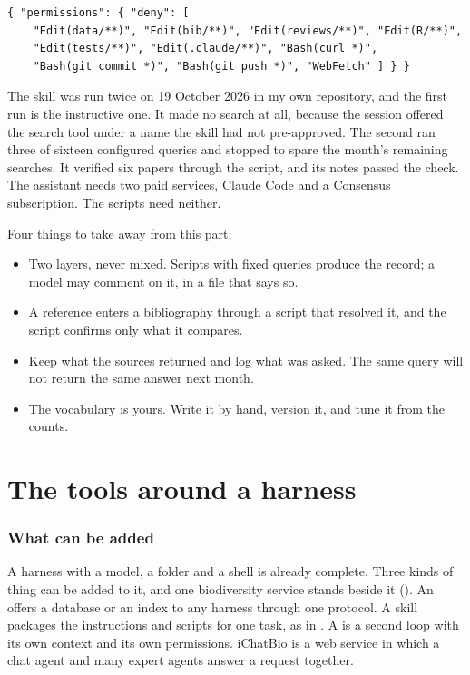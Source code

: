 \documentclass[11pt,a4paper]{article}
\begin{document}
\begin{lstlisting}[caption={.claude/settings.json, the deny list (shortened)}]
{ "permissions": { "deny": [
    "Edit(data/**)", "Edit(bib/**)", "Edit(reviews/**)", "Edit(R/**)",
    "Edit(tests/**)", "Edit(.claude/**)", "Bash(curl *)",
    "Bash(git commit *)", "Bash(git push *)", "WebFetch" ] } }
\end{lstlisting}

The skill was run twice on 19 October 2026 in my own repository, and the
first run is the instructive one. It made no search at all, because the
session offered the search tool under a name the skill had not pre-approved.
The second ran three of sixteen configured queries and stopped to spare the
month's remaining searches. It verified six papers through the script, and
its notes passed the check. The assistant needs two
paid services, Claude Code and a Consensus subscription. The scripts need
neither.

Four things to take away from this part:

\begin{itemize}
  \item Two layers, never mixed. Scripts with fixed queries produce the
    record; a model may comment on it, in a file that says so.
  \item A reference enters a bibliography through a script that resolved it,
    and the script confirms only what it compares.
  \item Keep what the sources returned and log what was asked. The same query
    will not return the same answer next month.
  \item The vocabulary is yours. Write it by hand, version it, and tune it
    from the counts.
\end{itemize}

\part{The tools around a harness}

\section{What can be added}
\label{sec:tools}

A harness with a model, a folder and a shell is already complete. Three kinds
of thing can be added to it, and one biodiversity service stands beside it
(). An  offers a database or an index to any
harness through one protocol. A skill packages the instructions and scripts
for one task, as in . A  is a second loop
with its own context and its own permissions. iChatBio is a web service in
which a chat agent and many expert agents answer a request together.
\end{document}
